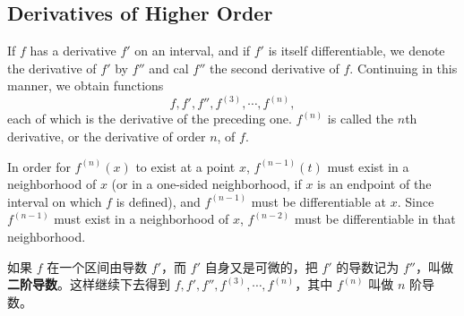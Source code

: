 \documentclass[../poma-notes.tex]{subfiles}
\begin{document}
\subsection*{Derivatives of Higher Order}

\begin{definition}
  If $f$ has a derivative $f'$ on an interval, and if $f'$ is itself differentiable, we denote the derivative of
  $f'$ by $f''$ and cal $f''$ the second derivative of $f$. Continuing in this manner, we obtain functions
  \[
    f,f',f'',f^(3),\cdots,f^(n),
  \]
  each of which is the derivative of the preceding one. $f^(n)$ is called the $n$th derivative, or the derivative
  of order $n$, of $f$.

  In order for $f^(n)(x)$ to exist at a point $x$, $f^(n-1)(t)$ must exist in a neighborhood of $x$ (or in a
  one-sided neighborhood, if $x$ is an endpoint of the interval on which $f$ is defined), and $f^(n-1)$ must be
  differentiable at $x$. Since $f^(n-1)$ must exist in a neighborhood of $x$, $f^(n-2)$ must be differentiable
  in that neighborhood.
\end{definition}

\begin{anote}
  如果 $f$ 在一个区间由导数 $f'$，而 $f'$ 自身又是可微的，把 $f'$ 的导数记为 $f''$，叫做\textbf{二阶导数}。这样继续下去得到
  $f, f', f'', f^(3), \cdots, f^(n)$，其中 $f^(n)$ 叫做 $n$ 阶导数。
\end{anote}
\end{document}
